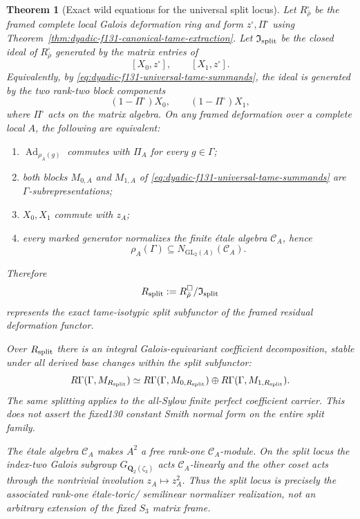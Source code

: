 \documentclass[11pt]{article}
\newtheorem{theorem}{Theorem}[section]
\theoremstyle{definition}
\begin{document}
\begin{theorem}[Exact wild equations for the universal split locus]
\label{thm:dyadic-f131-universal-split-locus}
Let $R_{\bar\rho}^{\square}$ be
the framed complete local
Galois deformation ring
and form $z^\square,\Pi^\square$
using Theorem~\ref{thm:dyadic-f131-canonical-tame-extraction}.
Let $\mathfrak I_{\rm split}$
be the closed ideal of
$R_{\bar\rho}^{\square}$
generated by the matrix entries of
\begin{equation}\label{eq:dyadic-f131-wild-split-equations}
\boxed{\qquad
[X_0,z^\square],\qquad
[X_1,z^\square].
\qquad}
\end{equation}
Equivalently, by
\eqref{eq:dyadic-f131-universal-tame-summands},
the ideal is generated by
the two rank-two block
components
\begin{equation}\label{eq:dyadic-f131-wild-split-projector-equations}
\boxed{\qquad
(1-\Pi^\square)X_0,\qquad
(1-\Pi^\square)X_1,
\qquad}
\end{equation}
where $\Pi^\square$ acts
on the \emph{matrix} algebra.
On any framed deformation
over a complete local $A$,
the following are equivalent:
\begin{enumerate}[label=\textnormal{(\roman*)}]
\item $\operatorname{Ad}_{\rho_A(g)}$
commutes with $\Pi_A$
for every $g\in\Gamma$;
\item both blocks $M_{0,A}$ and
$M_{1,A}$ of
\eqref{eq:dyadic-f131-universal-tame-summands}
are $\Gamma$-subrepresentations;
\item $X_0,X_1$ commute with $z_A$;
\item every marked generator
normalizes the finite étale
algebra $\mathcal C_A$,
hence
\[
\rho_A(\Gamma)\subseteq
N_{\mathrm{GL}_2(A)}(\mathcal C_A).
\]
\end{enumerate}
Therefore
\begin{equation}\label{eq:dyadic-f131-split-ring}
R_{\rm split}:=
R_{\bar\rho}^{\square}/\mathfrak I_{\rm split}
\end{equation}
represents the \emph{exact}
tame-isotypic split
subfunctor of the framed
residual deformation functor.

Over $R_{\rm split}$ there
is an integral Galois-equivariant
coefficient decomposition,
stable under all derived
base changes within the
split subfunctor:
\begin{equation}\label{eq:dyadic-f131-split-cochains}
R\Gamma(\Gamma,M_{R_{\rm split}})
\simeq
R\Gamma(\Gamma,M_{0,R_{\rm split}})
\oplus
R\Gamma(\Gamma,M_{1,R_{\rm split}}).
\end{equation}
The same splitting applies
to the all-Sylow finite
perfect coefficient carrier.
This does \emph{not} assert
the fixed130 constant Smith
normal form on the entire
split family.

The étale algebra
$\mathcal C_A$ makes $A^2$
a free rank-one
$\mathcal C_A$-module.
On the split locus the
index-two Galois subgroup
$G_{\mathbf Q_2(\zeta_3)}$
acts $\mathcal C_A$-linearly
and the other coset
acts through the
nontrivial involution
$z_A\mapsto z_A^2$.
Thus the split locus is
precisely the associated
rank-one étale-toric/
semilinear normalizer
realization, not an
arbitrary extension of
the fixed $S_3$ matrix frame.
\end{theorem}
\end{document}

